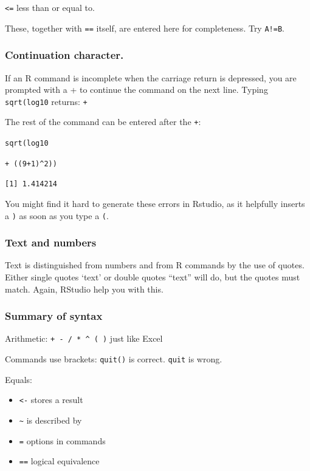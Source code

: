 \documentclass[
]{book}
\makeatletter
\providecommand{\tightlist}{%
  \setlength{\itemsep}{0pt}\setlength{\parskip}{0pt}}
\newenvironment{kframe}{%
\medskip{}
\setlength{\fboxsep}{.8em}
 \def\at@end@of@kframe{}%
 \ifinner\ifhmode%
  \def\at@end@of@kframe{\end{minipage}}%
  \begin{minipage}{\columnwidth}%
 \fi\fi%
 \def\FrameCommand##1{\hskip\@totalleftmargin \hskip-\fboxsep
 \colorbox{shadecolor}{##1}\hskip-\fboxsep
     \hskip-\linewidth \hskip-\@totalleftmargin \hskip\columnwidth}%
 \MakeFramed {\advance\hsize-\width
   \@totalleftmargin\z@ \linewidth\hsize
   \@setminipage}}%
 {\par\unskip\endMakeFramed%
 \at@end@of@kframe}
\newenvironment{rmdblock}[1]
  {
  \begin{itemize}
  \renewcommand{\labelitemi}{
    \raisebox{-.7\height}[0pt][0pt]{
      {\setkeys{Gin}{width=3em,keepaspectratio}\texttt{[image: images/\#1]}}
    }
  }
  \setlength{\fboxsep}{1em}
  \begin{kframe}
  \item
  }
  {
  \end{kframe}
  \end{itemize}
  }
\newenvironment{rmdnote}
  {\begin{rmdblock}{note}}
  {\end{rmdblock}}
\makeatother
\begin{document}
\texttt{\textless{}=} less than or equal to.

These, together with \texttt{==} itself, are entered here for completeness. Try \texttt{A!=B}.

\hypertarget{continuation-character.}{%
\subsubsection{Continuation character.}\label{continuation-character.}}

If an R command is incomplete when the carriage return is depressed, you are prompted with a + to continue the command on the next line. Typing \texttt{sqrt(log10} returns: \texttt{+}

The rest of the command can be entered after the \texttt{+}:

\texttt{sqrt(log10}

\texttt{+\ ((9+1)\^{}2))}

\texttt{{[}1{]}\ 1.414214}

\begin{rmdnote}
You might find it hard to generate these errors in Rstudio, as it helpfully inserts a \texttt{)} as soon as you type a \texttt{(}.
\end{rmdnote}

\hypertarget{text-and-numbers}{%
\subsubsection{Text and numbers}\label{text-and-numbers}}

Text is distinguished from numbers and from R commands by the use of quotes. Either single quotes `text' or double quotes ``text'' will do, but the quotes must match. Again, RStudio help you with this.

\hypertarget{summary-of-syntax}{%
\subsubsection{Summary of syntax}\label{summary-of-syntax}}

Arithmetic: \texttt{+\ -\ /\ *\ \^{}\ (\ )} just like Excel

Commands use brackets: \texttt{quit()} is correct. \texttt{quit} is wrong.

Equals:

\begin{itemize}
\tightlist
\item
  \texttt{\textless{}-} stores a result
\item
  \texttt{\textasciitilde{}} is described by
\item
  \texttt{=} options in commands
\item
  \texttt{==} logical equivalence
\end{itemize}
\end{document}
